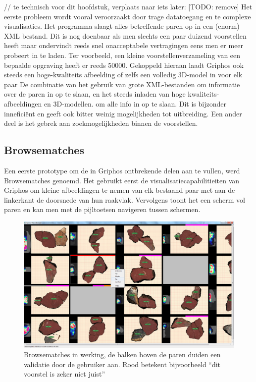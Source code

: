 // te technisch voor dit hoofdstuk, verplaats naar iets later: [TODO: remove]
Het eerste probleem wordt vooral veroorzaakt door trage datatoegang en te complexe visualisaties. Het programma slaagt alles betreffende paren op in een (enorm) XML bestand. Dit is nog doenbaar als men slechts een paar duizend voorstellen heeft maar ondervindt reeds snel onacceptabele vertragingen eens men er meer probeert in te laden. Ter voorbeeld, een kleine voorstellenverzameling van een bepaalde opgraving heeft er reeds 50000. Gekoppeld hieraan laadt Griphos ook steeds een hoge-kwaliteits afbeelding of zelfs een volledig 3D-model in voor elk paar De combinatie van het gebruik van grote XML-bestanden om informatie over de paren in op te slaan, en het steeds inladen van hoge kwaliteits-afbeeldingen en 3D-modellen. om alle info in op te slaan. Dit is bijzonder innefici\"ent en geeft ook bitter weinig mogelijkheden tot uitbreiding. Een ander deel is het gebrek aan zoekmogelijkheden binnen de voorstellen.

\subsection{Browsematches}

Een eerste prototype om de in Griphos ontbrekende delen aan te vullen, werd Browsematches genoemd. Het gebruikt eerst de visualisatiecapabilitieiten van Griphos om kleine afbeeldingen te nemen van elk bestaand paar met aan de linkerkant de doorsnede van hun raakvlak. Vervolgens toont het een scherm vol paren en kan men met de pijltoetsen navigeren tussen schermen. \\

\begin{figure}[ht]
	\begin{center}
		\includegraphics[width=.8\columnwidth]{images/browsematches-01-cut.png}
		\caption{Browsematches in werking, de balken boven de paren duiden een validatie door de gebruiker aan. Rood betekent bijvoorbeeld ``dit voorstel is zeker niet juist''}
	\end{center}
\end{figure}

